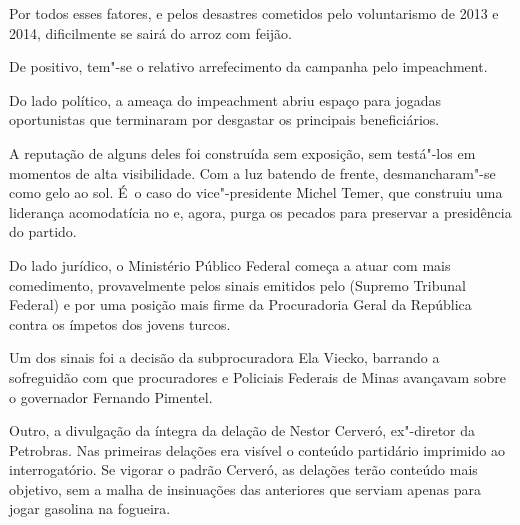 Por todos esses fatores, e pelos desastres cometidos pelo voluntarismo
de 2013 e 2014, dificilmente se sairá do arroz com feijão.

\asterisc{}

De positivo, tem"-se o relativo arrefecimento da campanha pelo
impeachment.

Do lado político, a ameaça do impeachment abriu espaço para jogadas
oportunistas que terminaram por desgastar os principais beneficiários.

A reputação de alguns deles foi construída sem exposição, sem testá"-los
em momentos de alta visibilidade. Com a luz batendo de frente,
desmancharam"-se como gelo ao sol. É~o caso do vice"-presidente Michel
Temer, que construiu uma liderança acomodatícia no  e, agora, purga
os pecados para preservar a presidência do partido.

\asterisc{}

Do lado jurídico, o Ministério Público Federal começa a atuar com mais
comedimento, provavelmente pelos sinais emitidos pelo  (Supremo
Tribunal Federal) e por uma posição mais firme da Procuradoria Geral da
República contra os ímpetos dos jovens turcos.

Um dos sinais foi a decisão da subprocuradora Ela Viecko, barrando a
sofreguidão com que procuradores e Policiais Federais de Minas avançavam
sobre o governador Fernando Pimentel.

Outro, a divulgação da íntegra da delação de Nestor Cerveró, ex"-diretor
da Petrobras. Nas primeiras delações era visível o conteúdo partidário
imprimido ao interrogatório. Se vigorar o padrão Cerveró, as delações
terão conteúdo mais objetivo, sem a malha de insinuações das anteriores
que serviam apenas para jogar gasolina na fogueira.
